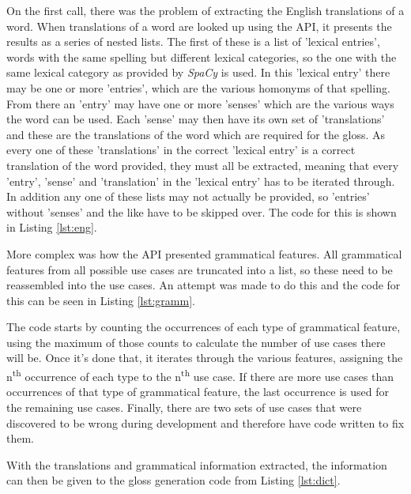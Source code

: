 On the first call, there was the problem of extracting the English translations of a word. When translations of a word are looked up using the API, it presents the results as a series of nested lists.  The first of these is a list of 'lexical entries', words with the same spelling but different lexical categories, so the one with the same lexical category as provided by \textit{SpaCy} is used. In this 'lexical entry' there may be one or more 'entries', which are the various homonyms of that spelling. From there an 'entry' may have one or more 'senses' which are the various ways the word can be used. Each 'sense' may then have its own set of 'translations' and these are the translations of the word which are required for the gloss. As every one of these 'translations' in the correct 'lexical entry' is a correct translation of the word provided, they must all be extracted, meaning that every 'entry', 'sense' and 'translation' in the 'lexical entry' has to be iterated through. In addition any one of these lists may not actually be provided, so 'entries' without 'senses' and the like have to be skipped over. The code for this is shown in Listing \ref{lst:eng}. 



More complex was how the API presented grammatical features. All grammatical features from all possible use cases are truncated into a list, so these need to be reassembled into the use cases. An attempt was made to do this and the code for this can be seen in Listing \ref{lst:gramm}.



The code starts by counting the occurrences of each type of grammatical feature, using the maximum of those counts to calculate the number of use cases there will be. Once it's done that, it iterates through the various features, assigning the n\textsuperscript{th} occurrence of each type to the n\textsuperscript{th} use case. If there are more use cases than occurrences of that type of grammatical feature, the last occurrence is used for the remaining use cases. Finally, there are two sets of use cases that were discovered to be wrong during development and therefore have code written to fix them. 

With the translations and grammatical information extracted, the information can then be given to the gloss generation code from Listing \ref{lst:dict}. 

